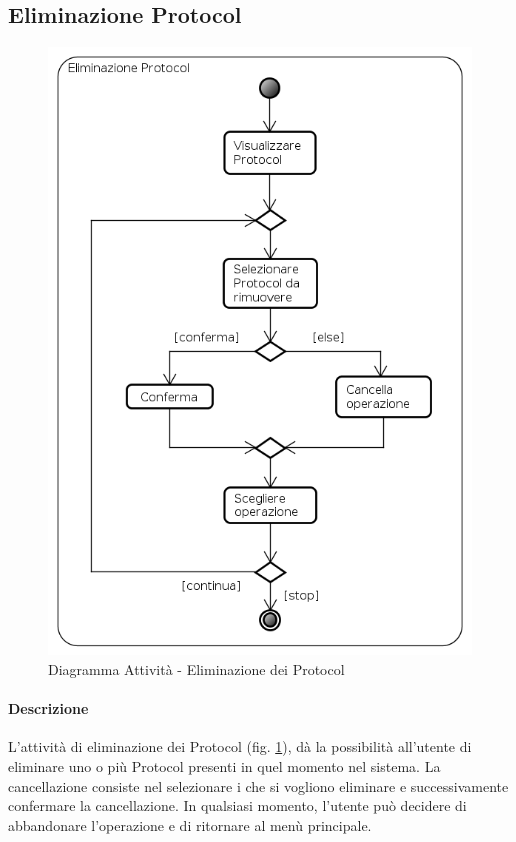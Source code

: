 \subsection{Eliminazione Protocol}
\label{ManageProt}
\begin{figure}[!h]
	\centering
	\includegraphics[scale=0.6]{./img/Diagrammi_Attivita/Eliminazione_Protocol}
	\caption{Diagramma Attività - Eliminazione dei Protocol}
	\label{ManagePr}
\end{figure}
\paragraph{Descrizione\\}
L'attività di eliminazione dei Protocol\glossario{} (fig. \ref{ManagePr}), dà la possibilità all'utente di eliminare uno o più Protocol\glossario{} presenti in quel momento nel sistema. La cancellazione consiste nel selezionare i \protocol{} che si vogliono eliminare e successivamente confermare la cancellazione. In qualsiasi momento, l'utente può decidere di abbandonare l'operazione e di ritornare al menù principale.
\pagebreak

